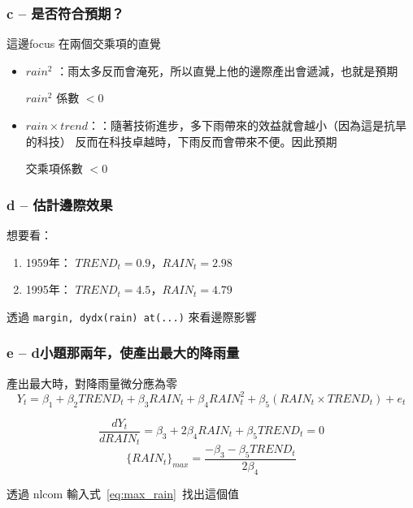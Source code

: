 \begin{frame}
    \frametitle{c -- 是否符合預期？}
    這邊focus 在兩個交乘項的直覺
    \begin{itemize}
        \item $rain^2$ ：雨太多反而會淹死，所以直覺上他的邊際產出會遞減，也就是預期
        \begin{center}
                $rain^2$ 係數 $<0$
        \end{center}
        \item $rain \times trend$：：隨著技術進步，多下雨帶來的效益就會越小（因為這是抗旱的科技）
        反而在科技卓越時，下雨反而會帶來不便。因此預期
        \begin{center}
            交乘項係數 $<0$
        \end{center}
    \end{itemize}
\end{frame}

\begin{frame}
    \frametitle{d -- 估計邊際效果}
    想要看：
    \begin{enumerate}
        \item 1959年： $TREND_t=0.9$，$RAIN_t=2.98$
        \item 1995年： $TREND_t=4.5$，$RAIN_t=4.79$
    \end{enumerate}

    \vfill
    透過 \texttt{margin, dydx(rain) at(...)} 來看邊際影響
\end{frame}

\begin{frame}
    \frametitle{e -- d小題那兩年，使產出最大的降雨量}
    產出最大時，對降雨量微分應為零
    \begin{equation*}
        Y_t = \beta_1 + \beta_2 TREND_t + \beta_3 RAIN_t + \beta_4 RAIN_t^2 + \beta_5 (RAIN_t \times TREND_t) + e_t 
    \end{equation*}

    \begin{equation}
        \frac{d Y_t}{d RAIN_t} = \beta_3 + 2\beta_4 RAIN_t + \beta_5 TREND_t=0
    \end{equation}
    \begin{equation}
        \label{eq:max_rain}
        \{RAIN_t\}_{max} = \frac{-\beta_3 -\beta_5 TREND_t}{2\beta_4}
    \end{equation}

    \vfill
    透過 nlcom 輸入式~\ref{eq:max_rain}~找出這個值
\end{frame}